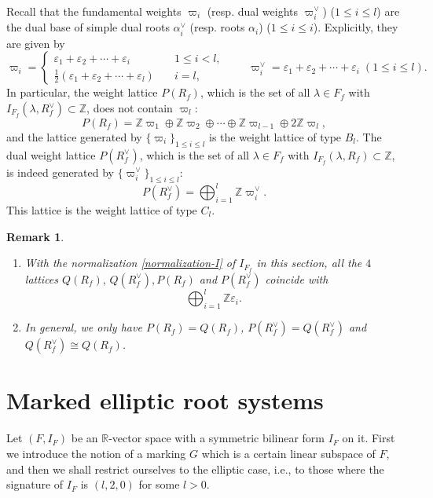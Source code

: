 \documentclass[11pt]{amsart}
\newcommand{\R}{\mathbb{R}}
\newcommand{\Z}{\mathbb{Z}}
\newtheorem{rem}[thm]{Remark}%
\newcommand{\vep}{\varepsilon}
\begin{document}
Recall that the fundamental weights $\varpi_i$  (resp. dual weights $\varpi_i^\vee$) ($1\leq i\leq l$) are the dual base of simple dual roots $\alpha_i^\vee$ (resp. roots $\alpha_i$) ($1\leq i\leq i$). Explicitly, they are given by
\[
\varpi_i=\begin{cases} \vep_1+\vep_2+\cdots +\vep_i \qquad &1\leq i<l, \\
           \frac{1}{2}(\vep_1+\vep_2+\cdots+\vep_l) \quad &i=l, \end{cases}
\qquad
\varpi_i^\vee= \vep_1+\vep_2+\cdots+\vep_i \; (1\leq i\leq l).
\]
In particular, the weight lattice $P(R_f)$, which is the set of all $\lambda \in F_f$ with $I_{F_f}(\lambda, R_f^\vee) \subset \Z$, does not contain $\varpi_l$:
\[ P(R_f)=\Z \varpi_1 \oplus \Z \varpi_2 \oplus \cdots \oplus \Z \varpi_{l-1}\oplus 2\Z \varpi_l,
\]
and the lattice generated by $\{\varpi_i\}_{1\leq i\leq l}$ is the weight lattice of type $B_l$. 
The dual weight lattice $P(R_f^\vee)$, which is the set of all $\lambda \in F_f$ with $I_{F_f}(\lambda, R_f)\subset \Z$, is indeed generated by $\{\varpi_i^\vee\}_{1\leq i\leq l}$:
\[ P(R_f^\vee)=\bigoplus_{i=1}^l \Z \varpi_i^\vee. \]
This lattice is the weight lattice of type $C_l$. 
\begin{rem}\label{rem_normalization}{\rm
\begin{enumerate}
\item With the normalization \eqref{normalization-I}  of $I_{F_f}$ in this section, 
all the $4$ lattices $Q(R_f), \, Q(R_f^\vee), P(R_f)$ and $P(R_f^\vee)$ coincide with
\[ \bigoplus_{i=1}^l \Z \vep_i .
\]
\item In general, we only have 
$P(R_f)=Q(R_f)$, $P(R_f^\vee)=Q(R_f^\vee)$ and $Q(R_f^\vee) \cong Q(R_f)$. 
\end{enumerate}}
\end{rem}
 



\section{Marked elliptic root systems}\label{sect:mers}
Let $(F,I_F)$ be an $\R$-vector space with a symmetric bilinear form $I_F$ on it. 
First we 
introduce the notion of a marking $G$ which is a certain linear subspace of $F$, and 
then we shall restrict ourselves to the elliptic case, i.e., to those where the signature of 
$I_F$ is $(l,2,0)$ for some $l>0$. 
\end{document}
